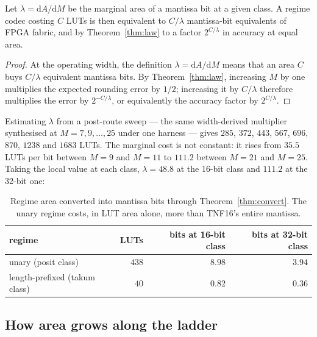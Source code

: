 \begin{theorem}
\label{thm:convert}
Let $\lambda = \mathrm{d}A/\mathrm{d}M$ be the marginal area of a mantissa bit at
a given class. A regime codec costing $C$ LUTs is then equivalent to $C/\lambda$
mantissa-bit equivalents of FPGA fabric, and by Theorem~\ref{thm:law} to a factor
$2^{C/\lambda}$ in accuracy at equal area.
\end{theorem}
\begin{proof}
At the operating width, the definition $\lambda=\mathrm{d}A/\mathrm{d}M$
means that an area $C$ buys $C/\lambda$ equivalent mantissa bits.  By
Theorem~\ref{thm:law}, increasing $M$ by one multiplies the expected rounding
error by $1/2$; increasing it by $C/\lambda$ therefore multiplies the error by
$2^{-C/\lambda}$, or equivalently the accuracy factor by $2^{C/\lambda}$.
\end{proof}

Estimating $\lambda$ from a post-route sweep --- the same width-derived multiplier synthesised at
$M = 7, 9, \ldots, 25$ under one harness --- gives $285$, $372$, $443$, $567$,
$696$, $870$, $1238$ and $1683$ LUTs. The marginal cost is not constant: it rises
from $35.5$ LUTs per bit between $M{=}9$ and $M{=}11$ to $111.2$ between $M{=}21$
and $M{=}25$. Taking the local value at each class, $\lambda = 48.8$ at the
16-bit class and $111.2$ at the 32-bit one:

\begin{table}[t]\centering
\caption{Regime area converted into mantissa bits through
Theorem~\ref{thm:convert}. The unary regime costs, in LUT area alone, more than
TNF16's entire mantissa.}
\label{tab:convert}
\begin{tabular}{lrrr}
\toprule
regime & LUTs & bits at 16-bit class & bits at 32-bit class \\
\midrule
unary (posit class)          & $438$ & $\mathbf{8.98}$ & $3.94$ \\
length-prefixed (takum class) & $40$  & $0.82$ & $0.36$ \\
\bottomrule
\end{tabular}
\end{table}


\subsection{How area grows along the ladder}\label{sec:arealaw}


